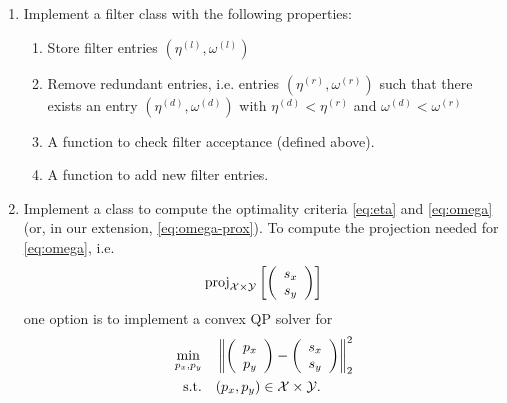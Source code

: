 \documentclass[11pt]{article}
\newcommand{\proj}{\operatorname{proj}}
\newcommand{\myvec}[1]{\left(\begin{array}{c} #1 \end{array}\right)}
\newcommand{\stn}{\text{s.t.}}
\begin{document}
\begin{enumerate}
\item Implement a filter class with the following properties:
  \begin{enumerate}
  \item Store filter entries $(\eta^{(l)}, \omega^{(l)})$
  \item Remove redundant entries, i.e. entries $(\eta^{(r)}, \omega^{(r)})$ such that
    there exists an entry $(\eta^{(d)}, \omega^{(d)})$ with $\eta^{(d)}<\eta^{(r)}$
    and $\omega^{(d)}<\omega^{(r)}$
  \item A function to check filter acceptance (defined above).
  \item A function to add new filter entries.
  \end{enumerate}
\item Implement a class to compute the optimality criteria \eqref{eq:eta} and
  \eqref{eq:omega} (or, in our extension, \eqref{eq:omega-prox}). To compute the projection needed for \eqref{eq:omega}, i.e.
  \begin{equation}\label{eq:proj-op}
    \proj_{\mathcal{X}\times{\cal Y}} \left[\myvec{s_x \\ s_y}\right]
  \end{equation}
  one option is to implement a convex QP solver for
  \begin{align}\label{eq:proj-qp}
    \min_{p_x, p_y} \quad & \left\| \myvec{p_x \\ p_y} - \myvec{s_x \\ s_y} \right\|_2^2 \\
    \stn \quad  & (p_x,p_y) \in {\cal X} \times {\cal Y}. \nonumber
  \end{align}


\end{enumerate}
\end{document}
